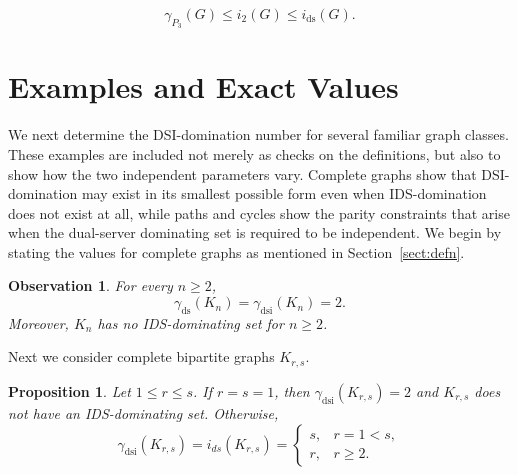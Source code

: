 \documentclass[11pt]{article}
\newtheorem{proposition}[theorem]{Proposition}
\newtheorem{observation}[theorem]{Observation}
\theoremstyle{definition}
\theoremstyle{remark}
\newcommand{\ds}{\mathrm{ds}}
\newcommand{\dsi}{\mathrm{dsi}}
\begin{document}
\[
   \gamma_{P_3}(G)\le i_2(G)\le i_{\ds}(G).
\]



\section{Examples and Exact Values}

We next determine the DSI-domination number for several familiar graph
classes. These examples are included not merely as checks on the definitions,
but also to show how the two independent parameters vary.
Complete graphs show that DSI-domination may exist in its smallest possible
form even when IDS-domination does not exist at all, while paths and cycles
show the parity constraints that arise when the dual-server dominating set is
required to be independent.  We begin by stating the values for complete graphs as mentioned in Section~\ref{sect:defn}.

\begin{observation}
For every \(n\ge 2\),
\[
   \gamma_{\ds}(K_n)=\gamma_{\dsi}(K_n)=2.
\]
Moreover, \(K_n\) has no IDS-dominating set for \(n\ge 2\).
\end{observation}


Next we consider complete bipartite graphs $K_{r,s}$.  


\begin{proposition}
\label{prop:complete-bipartite}
Let \(1\le r\le s\).  If $r = s = 1$, then $\gamma_{\dsi}(K_{r,s}) = 2$ and $K_{r,s}$ does not have an IDS-dominating set.  Otherwise,
\[
   \gamma_{\dsi}(K_{r,s})=i_{ds}(K_{r,s}) = 
   \begin{cases}
      s, & r=1<s,\\
      r, & r\ge 2.
   \end{cases}
\]
\end{proposition}
\end{document}
